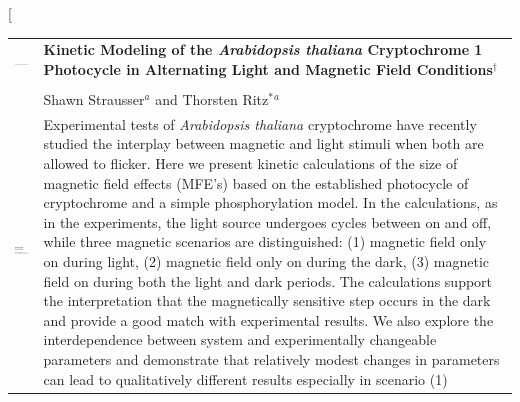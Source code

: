 \documentclass[twoside,twocolumn,9pt]{article}
\begin{document}
\twocolumn[
  \begin{@twocolumnfalse}
\vspace{3cm}
\sffamily
\begin{tabular}{m{4.5cm} p{13.5cm} }

\includegraphics{head_foot/DOI} & \noindent\LARGE{\textbf{Kinetic Modeling of the \textit{Arabidopsis thaliana} Cryptochrome 1
Photocycle in Alternating Light and Magnetic Field Conditions$^\dag$}} \\
\vspace{0.3cm} & \vspace{0.3cm} \\

& \noindent\large{Shawn Strausser\textit{$^{a}$} and Thorsten Ritz$^{\ast}$\textit{$^{a}$}} \\

\includegraphics{head_foot/dates} & \noindent\normalsize{Experimental tests of \textit{Arabidopsis thaliana} cryptochrome have
recently studied the interplay between magnetic and light stimuli when both are allowed to flicker. Here we present kinetic
calculations of the size of magnetic field effects (MFE's) based on the established photocycle of cryptochrome and a simple 
phosphorylation model. In the calculations, as in the experiments, the light source undergoes cycles between on and off, while 
three magnetic scenarios are distinguished: (1) magnetic field only on during light, (2) magnetic field only on during the dark, 
(3) magnetic field on during both the light and dark periods. The calculations support the interpretation that the magnetically 
sensitive step occurs in the dark and provide a good match with experimental results. We also explore the interdependence between 
system and experimentally changeable parameters and demonstrate that relatively modest changes in parameters can lead to 
qualitatively different results especially in scenario (1)}

\end{tabular}

 \end{@twocolumnfalse} \vspace{0.6cm}
\end{document}
